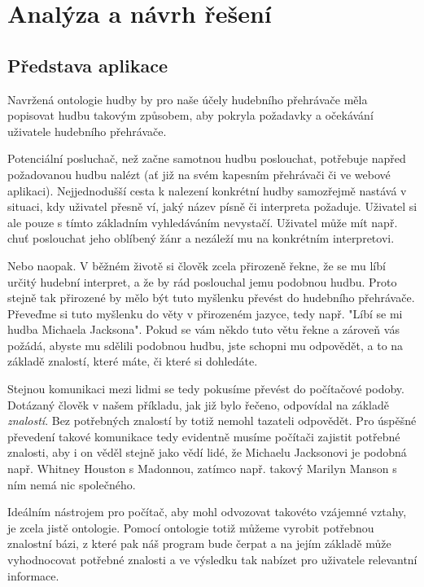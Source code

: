 \chapter{Analýza a návrh řešení}

\section{Představa aplikace}

Navržená ontologie hudby by pro naše účely hudebního přehrávače měla popisovat hudbu takovým způsobem, aby pokryla požadavky a očekávání uživatele hudebního přehrávače.


Potenciální posluchač, než začne samotnou hudbu poslouchat, potřebuje napřed požadovanou hudbu nalézt (ať již na svém kapesním přehrávači či ve webové aplikaci).
Nejjednodušší cesta k nalezení konkrétní hudby samozřejmě nastává v situaci, kdy uživatel přesně ví, jaký název písně či interpreta požaduje. Uživatel si ale pouze s tímto základním vyhledáváním nevystačí.
Uživatel může mít např. chuť poslouchat jeho oblíbený žánr a nezáleží mu na konkrétním interpretovi. 

Nebo naopak. V běžném životě si člověk zcela přirozeně řekne, že se mu líbí určitý hudební interpret, a že by rád poslouchal jemu podobnou hudbu. Proto stejně tak přirozené by mělo být tuto myšlenku převést do hudebního přehrávače.
Převeďme si tuto myšlenku do věty v přirozeném jazyce, tedy např. "Líbí se mi hudba Michaela Jacksona". 
Pokud se vám někdo tuto větu řekne a zároveň vás požádá, abyste mu sdělili podobnou hudbu, jste schopni mu odpovědět, a to na základě znalostí, které máte, či které si dohledáte.
 
Stejnou komunikaci mezi lidmi se tedy pokusíme převést do počítačové podoby. 
Dotázaný člověk v našem příkladu, jak již bylo řečeno, odpovídal na základě \textit{znalostí}. Bez potřebných znalostí by totiž nemohl tazateli odpovědět.
Pro úspěšné převedení takové komunikace tedy evidentně musíme počítači zajistit potřebné znalosti, aby i on věděl stejně jako vědí lidé, že Michaelu Jacksonovi je podobná např. Whitney Houston s Madonnou, zatímco např. takový Marilyn Manson s ním nemá nic společného. 

Ideálním nástrojem pro počítač, aby mohl odvozovat takovéto vzájemné vztahy, je zcela jistě ontologie.
Pomocí ontologie totiž můžeme vyrobit potřebnou znalostní bázi, z které pak náš program bude čerpat a na jejím základě může vyhodnocovat potřebné znalosti a ve výsledku tak nabízet pro uživatele relevantní informace.

